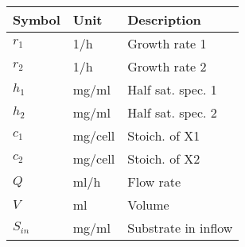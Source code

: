   \begin{tabular}{lll}\hline
    \textbf{Symbol} & \textbf{Unit} & \textbf{Description} \\ \hline
    $r_1$ & 1/h & Growth rate 1 \\
    $r_2$ & 1/h & Growth rate 2 \\
    $h_1$ & mg/ml & Half sat. spec. 1 \\
    $h_2$ & mg/ml & Half sat. spec. 2 \\
    $c_1$ & mg/cell & Stoich. of X1 \\
    $c_2$ & mg/cell & Stoich. of X2 \\
    $Q$ & ml/h & Flow rate \\
    $V$ & ml & Volume \\
    $S_{in}$ & mg/ml & Substrate in inflow \\ \hline
  \end{tabular}

